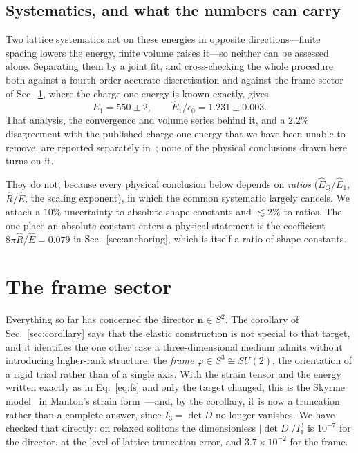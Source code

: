 \documentclass[aps,prd,preprint,nofootinbib,longbibliography]{revtex4-2}
\newcommand{\nv}{\bm{n}}
\newcommand{\Ehat}{\hat{E}}
\newcommand{\Rhat}{\hat{R}}
\begin{document}
\subsection{Systematics, and what the numbers can carry}

Two lattice systematics act on these energies in opposite directions---finite
spacing lowers the energy, finite volume raises it---so neither can be assessed
alone. Separating them by a joint fit, and cross-checking the whole procedure
both against a fourth-order accurate discretisation and against the frame sector
of Sec.~\ref{sec:frame}, where the charge-one energy is known exactly, gives
\begin{equation}
\Ehat_1 = 550\pm2, \qquad \Ehat_1/c_0 = 1.231\pm0.003 .
\label{eq:e1}
\end{equation}
That analysis, the convergence and volume series behind it, and a $2.2\%$
disagreement with the published charge-one energy that we have been unable to
remove, are reported separately in~\cite{lattice}; none of the physical
conclusions drawn here turns on it.

They do not, because every physical conclusion below depends on \emph{ratios}
($\Ehat_Q/\Ehat_1$, $\Rhat/\Ehat$, the scaling exponent), in which the common
systematic largely cancels. We attach a $10\%$ uncertainty to absolute shape
constants and $\lesssim2\%$ to ratios. The one place an absolute constant enters
a physical statement is the coefficient $8\pi\Rhat/\Ehat=0.079$ in
Sec.~\ref{sec:anchoring}, which is itself a ratio of shape constants.

\section{The frame sector}
\label{sec:frame}

Everything so far has concerned the director $\nv\in S^2$. The corollary of
Sec.~\ref{sec:corollary} says that the elastic construction is not special to
that target, and it identifies the one other case a three-dimensional medium
admits without introducing higher-rank structure: the \emph{frame}
$\varphi\in S^3\cong SU(2)$, the orientation of a rigid triad rather than of a
single axis. With the strain tensor and the energy written exactly as in
Eq.~\eqref{eq:fs} and only the target changed, this is the Skyrme
model~\cite{skyrme1961} in Manton's strain form~\cite{manton1987}---and, by the
corollary, it is now a truncation rather than a complete answer, since
$I_3=\det D$ no longer vanishes. We have checked that directly: on relaxed
solitons the dimensionless $|\det D|/I_1^3$ is $10^{-7}$ for the director, at the
level of lattice truncation error, and $3.7\times10^{-2}$ for the frame.
\end{document}
